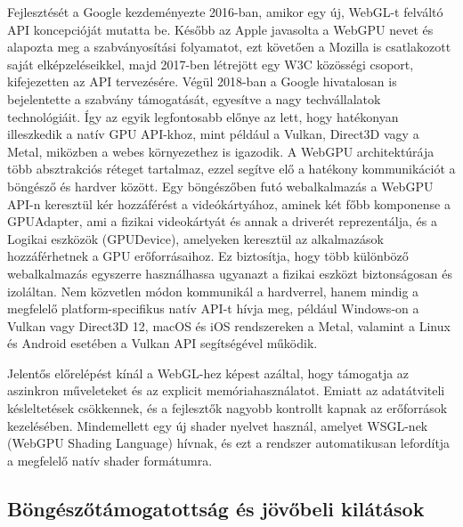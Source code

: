 \documentclass[12pt]{report}
\begin{document}
        Fejlesztését a Google kezdeményezte 2016-ban, amikor egy új, WebGL-t felváltó API koncepcióját mutatta be. Később az Apple javasolta a WebGPU nevet és alapozta meg a szabványosítási folyamatot, ezt követően a Mozilla is csatlakozott saját elképzeléseikkel, majd 2017-ben létrejött egy W3C közösségi csoport, kifejezetten az API tervezésére. Végül 2018-ban a Google hivatalosan is bejelentette a szabvány támogatását, egyesítve a nagy techvállalatok technológiáit. Így az egyik legfontosabb előnye az lett, hogy hatékonyan illeszkedik a natív GPU API-khoz, mint például a Vulkan, Direct3D vagy a Metal, miközben a webes környezethez is igazodik. A WebGPU architektúrája több absztrakciós réteget tartalmaz, ezzel segítve elő a hatékony kommunikációt a böngésző és hardver között. Egy böngészőben futó webalkalmazás a WebGPU API-n keresztül kér hozzáférést a videókártyához, aminek két főbb komponense a GPUAdapter, ami a fizikai videokártyát és annak a driverét reprezentálja, és a Logikai eszközök (GPUDevice), amelyeken keresztül az alkalmazások hozzáférhetnek a GPU erőforrásaihoz.  Ez biztosítja, hogy több különböző webalkalmazás egyszerre használhassa ugyanazt a fizikai eszközt biztonságosan és izoláltan. Nem közvetlen módon kommunikál a hardverrel, hanem mindig a megfelelő platform-specifikus natív API-t hívja meg, például Windows-on a Vulkan vagy Direct3D 12, macOS és iOS rendszereken a Metal, valamint a Linux és Android esetében a Vulkan API segítségével működik.
        
        Jelentős előrelépést kínál a WebGL-hez képest azáltal, hogy támogatja az aszinkron műveleteket és az explicit memóriahasználatot. Emiatt az adatátviteli késleltetések csökkennek, és a fejlesztők nagyobb kontrollt kapnak az erőforrások kezelésében. Mindemellett egy új shader nyelvet használ, amelyet WSGL-nek (WebGPU Shading Language) hívnak, és ezt a rendszer automatikusan lefordítja a megfelelő natív shader formátumra.
        
        \subsection{Böngészőtámogatottság és jövőbeli kilátások}
\end{document}
